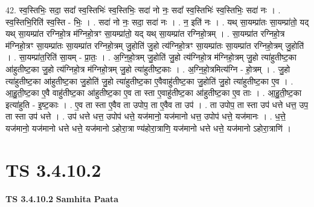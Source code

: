 \documentclass[17pt]{extarticle}
\begin{document}
42. स्व॒स्तिभिः॒ सदा॒ सदा᳚ स्व॒स्तिभिः॑ स्व॒स्तिभिः॒ सदा॑ नो नः॒ सदा᳚ स्व॒स्तिभिः॑ स्व॒स्तिभिः॒ सदा॑ नः । . स्व॒स्तिभि॒रिति॑ स्व॒स्ति - भिः॒ । . सदा॑ नो नः॒ सदा॒ सदा॑ नः । . न॒ इति॑ नः । . यथ् सा॒यम्प्रा॑तः सा॒यम्प्रा॑तो॒ यद् यथ् सा॒यम्प्रा॑त रग्निहो॒त्र म॑ग्निहो॒त्रꣳ सा॒यम्प्रा॑तो॒ यद् यथ् सा॒यम्प्रा॑त रग्निहो॒त्रम् । . सा॒यम्प्रा॑त रग्निहो॒त्र म॑ग्निहो॒त्रꣳ सा॒यम्प्रा॑तः सा॒यम्प्रा॑त रग्निहो॒त्रम् जु॒होति॑ जु॒हो त्य॑ग्निहो॒त्रꣳ 
सा॒यम्प्रा॑तः सा॒यम्प्रा॑त रग्निहो॒त्रम् जु॒होति॑ । . सा॒यम्प्रा॑त॒रिति॑ सा॒यम् - प्रा॒तः॒ । . अ॒ग्नि॒हो॒त्रम् जु॒होति॑ जु॒हो त्य॑ग्निहो॒त्र म॑ग्निहो॒त्रम् जु॒हो त्या॑हुतीष्ट॒का आ॑हुतीष्ट॒का जु॒हो त्य॑ग्निहो॒त्र 
म॑ग्निहो॒त्रम् जु॒हो त्या॑हुतीष्ट॒काः । . अ॒ग्नि॒हो॒त्रमित्य॑ग्नि - हो॒त्रम् । . जु॒हो त्या॑हुतीष्ट॒का आ॑हुतीष्ट॒का जु॒होति॑ जु॒हो त्या॑हुतीष्ट॒का ए॒वैवाहु॑तीष्ट॒का जु॒होति॑ जु॒हो त्या॑हुतीष्ट॒का ए॒व । . आ॒हु॒ती॒ष्ट॒का ए॒वै वाहु॑तीष्ट॒का आ॑हुतीष्ट॒का ए॒व ता स्ता ए॒वाहु॑तीष्ट॒का आ॑हुतीष्ट॒का ए॒व ताः । . आ॒हु॒ती॒ष्ट॒का इत्या॑हुति - इ॒ष्ट॒काः । . ए॒व ता स्ता ए॒वैव ता उपोप॒ ता ए॒वैव ता उप॑ । . ता उपोप॒ ता स्ता उप॑ धत्ते धत्त॒ उप॒ ता स्ता उप॑ धत्ते । . उप॑ धत्ते धत्त॒ उपोप॑ धत्ते॒ यज॑मानो॒ यज॑मानो धत्त॒ उपोप॑ धत्ते॒ यज॑मानः । . ध॒त्ते॒ यज॑मानो॒ यज॑मानो धत्ते धत्ते॒ यज॑मानो ऽहोरा॒त्रा ण्य॑होरा॒त्राणि॒ यज॑मानो धत्ते धत्ते॒ यज॑मानो ऽहोरा॒त्राणि॑ । \newline
\pagebreak
{}

\section{ TS 3.4.10.2 }

\textbf{TS 3.4.10.2 } \newline
\textbf{Samhita Paata} \newline
\end{document}
